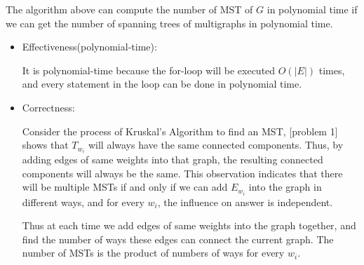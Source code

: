     The algorithm above can compute the number of MST of $G$ in polynomial time if we can get the number of spanning trees of multigraphs in polynomial time.
    \begin{itemize}
        \item Effectiveness(polynomial-time):

            It is polynomial-time because the for-loop will be executed $O(|E|)$ times, and every statement in the loop can be done in polynomial time.

        \item Correctness:

            Consider the process of Kruskal's Algorithm to find an MST, [problem 1] shows that $T_{w_i}$ will always have the same connected components. Thus, by adding edges of same weights into that graph, the resulting connected components will always be the same. This observation indicates that there will be multiple MSTs if and only if we can add $E_{w_i}$ into the graph in different ways, and for every $w_i$, the influence on answer is independent.

            Thus at each time we add edges of same weights into the graph together, and find the number of ways these edges can connect the current graph. The number of MSTs is the product of numbers of ways for every $w_i$.


    \end{itemize}
    

